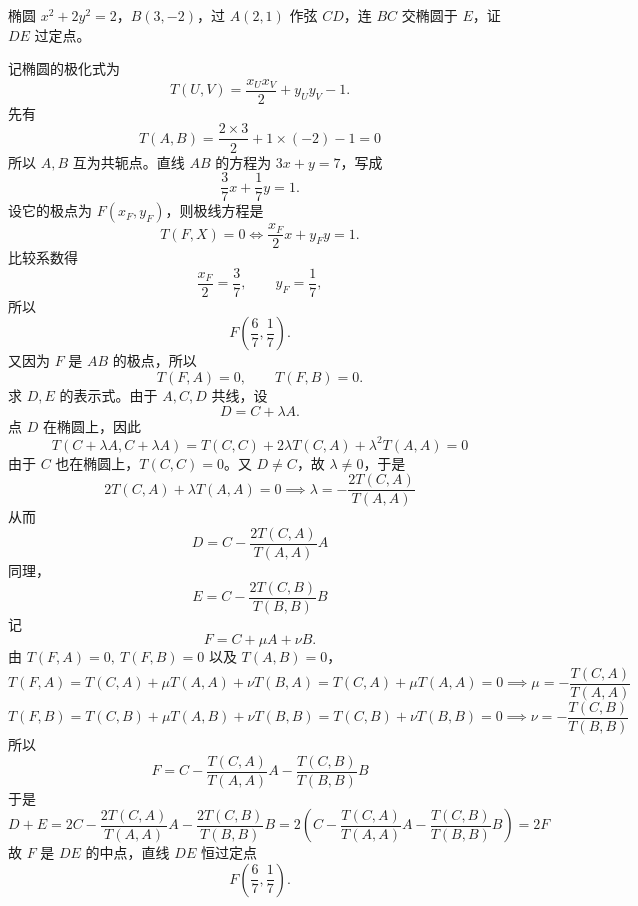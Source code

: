 \begin{exercise}
椭圆 $x^2+2y^2=2$，$B(3,-2)$，过 $A(2,1)$ 作弦 $CD$，连 $BC$ 交椭圆于 $E$，证 $DE$ 过定点。
\end{exercise}
\begin{solution}
记椭圆的极化式为
$$T(U,V) = \frac{x_U x_V}{2} + y_U y_V - 1.$$
先有
$$ T(A,B) = \frac{2 \times 3}{2} + 1 \times (-2) - 1 = 0 $$
所以 $A,B$ 互为共轭点。直线 $AB$ 的方程为 $3x+y=7$，写成
$$\frac{3}{7}x+\frac{1}{7}y=1.$$
设它的极点为 $F(x_F,y_F)$，则极线方程是
$$T(F,X)=0\iff \frac{x_F}{2}x+y_Fy=1.$$
比较系数得
$$\frac{x_F}{2}=\frac{3}{7},\qquad y_F=\frac{1}{7},$$
所以
$$F\left(\frac{6}{7}, \frac{1}{7}\right).$$
又因为 $F$ 是 $AB$ 的极点，所以
$$T(F,A)=0,\qquad T(F,B)=0.$$
求 $D,E$ 的表示式。由于 $A,C,D$ 共线，设
$$D=C+\lambda A.$$
点 $D$ 在椭圆上，因此
$$ T(C+\lambda A, C+\lambda A) = T(C,C) + 2\lambda T(C,A) + \lambda^2 T(A,A) = 0 $$
由于 $C$ 也在椭圆上，$T(C,C)=0$。又 $D\neq C$，故 $\lambda \neq 0$，于是
$$ 2T(C,A) + \lambda T(A,A) = 0 \implies \lambda = -\frac{2T(C,A)}{T(A,A)} $$
从而
$$ D = C - \frac{2T(C,A)}{T(A,A)} A $$
同理，
$$ E = C - \frac{2T(C,B)}{T(B,B)} B $$
记
$$F = C + \mu A + \nu B.$$
由 $T(F,A)=0,\ T(F,B)=0$ 以及 $T(A,B)=0$，
$$ T(F,A) = T(C,A) + \mu T(A,A) + \nu T(B,A) = T(C,A) + \mu T(A,A) = 0 \implies \mu = -\frac{T(C,A)}{T(A,A)} $$
$$ T(F,B) = T(C,B) + \mu T(A,B) + \nu T(B,B) = T(C,B) + \nu T(B,B) = 0 \implies \nu = -\frac{T(C,B)}{T(B,B)} $$
所以
$$ F = C - \frac{T(C,A)}{T(A,A)} A - \frac{T(C,B)}{T(B,B)} B $$
于是
$$ D + E = 2C - \frac{2T(C,A)}{T(A,A)} A - \frac{2T(C,B)}{T(B,B)} B = 2\left( C - \frac{T(C,A)}{T(A,A)} A - \frac{T(C,B)}{T(B,B)} B \right) = 2F $$
故 $F$ 是 $DE$ 的中点，直线 $DE$ 恒过定点
$$F\left(\frac{6}{7}, \frac{1}{7}\right).$$
\end{solution}

